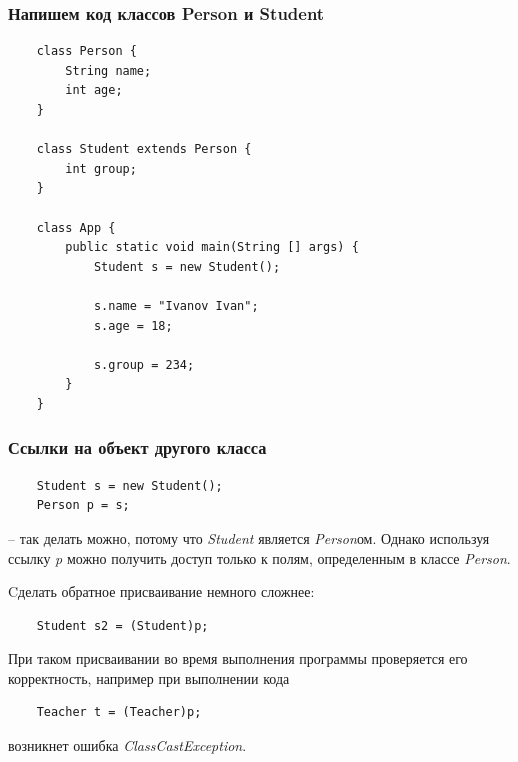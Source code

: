 \begin{frame}[fragile]
	\frametitle{Напишем код классов Person и Student}

	\begin{verbatim}
	class Person {
	    String name;
	    int age;
	}

	class Student extends Person {
	    int group;
	}
	
	class App {
	    public static void main(String [] args) {
	        Student s = new Student();

	        s.name = "Ivanov Ivan";
	        s.age = 18;

	        s.group = 234;
	    }
	}
	\end{verbatim}
\end{frame}

\begin{frame}[fragile]
	\frametitle{Ссылки на объект другого класса}

	\begin{large}
	\begin{verbatim}
	Student s = new Student();
	Person p = s;
	\end{verbatim}
	\end{large}
	\color{gray}
	-- так делать можно, потому что \emph{Student} является \emph{Person}ом. Однако используя ссылку \emph{p} можно получить доступ только к полям, определенным в классе \emph{Person}.

	\medskip
	Cделать обратное присваивание немного сложнее:
	\color{black}
	\begin{large}
	\begin{verbatim}
	Student s2 = (Student)p;
	\end{verbatim}
	\end{large}

	\color{gray}
	При таком присваивании во время выполнения программы проверяется его корректность, например при выполнении кода
	\color{black}
	\begin{large}
	\begin{verbatim}
	Teacher t = (Teacher)p;
	\end{verbatim}
	\end{large}
	\color{gray}
	возникнет ошибка \emph{ClassCastException}.
	\color{black}
\end{frame}

